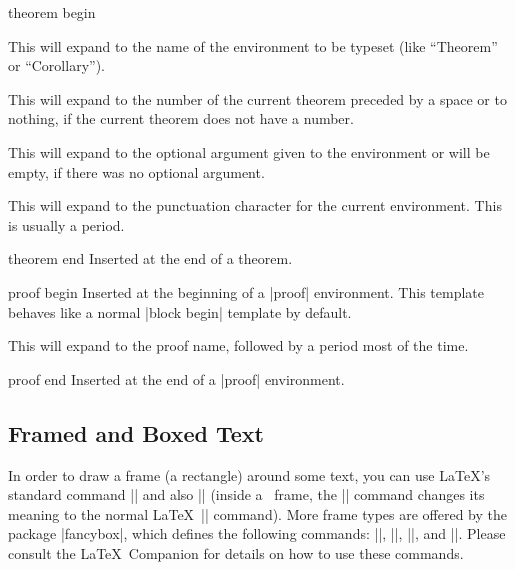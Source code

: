 \begin{element}{theorem begin}
\begin{itemize}
    \iteminsert{\inserttheoremname}
    This will expand to the name of the environment to be typeset (like ``Theorem'' or ``Corollary'').

    \iteminsert{\inserttheoremnumber}
    This will expand to the number of the current theorem preceded by a space or to nothing, if the current theorem does not have a number.

    \iteminsert{\inserttheoremaddition}
    This will expand to the optional argument given to the environment or will be empty, if there was no optional argument.

    \iteminsert{\inserttheorempunctuation}
    This will expand to the punctuation character for the current environment. This is usually a period.
  \end{itemize}
\end{element}

\begin{element}{theorem end}\yes\no\no
  Inserted at the end of a theorem.
\end{element}

\begin{element}{proof begin}\yes\no\no
  Inserted at the beginning of a |proof| environment. This template behaves like a normal |block begin| template by default.

  \begin{itemize}
    \iteminsert{\insertproofname}
    This will expand to the proof name, followed by a period most of the time.
  \end{itemize}
\end{element}

\begin{element}{proof end}\yes\no\no
  Inserted at the end of a |proof| environment.
\end{element}

\subsection{Framed and Boxed Text}

In order to draw a frame (a rectangle) around some text, you can use \LaTeX's standard command |\fbox| and also |\frame| (inside a \beamer\ frame, the |\frame| command changes its meaning to the normal \LaTeX\ |\frame| command). More frame types are offered by the package |fancybox|, which defines the following commands: |\shadowbox|, |\doublebox|, |\ovalbox|, and |\Ovalbox|. Please consult the \LaTeX\ Companion for details on how to use these commands.

